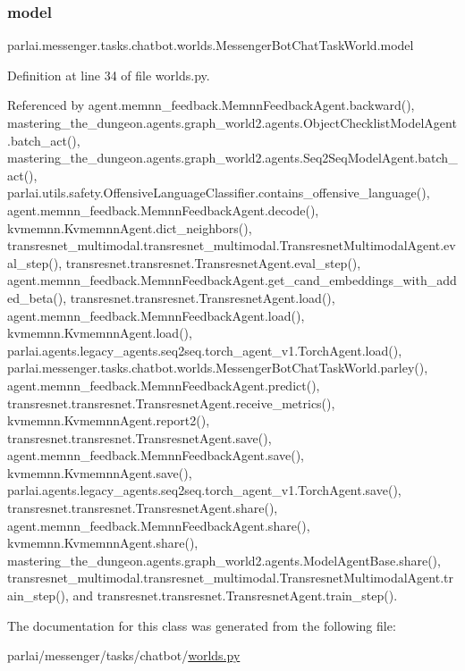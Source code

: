 \subsubsection{\texorpdfstring{model}{model}}
{\footnotesize\ttfamily parlai.\+messenger.\+tasks.\+chatbot.\+worlds.\+Messenger\+Bot\+Chat\+Task\+World.\+model}



Definition at line 34 of file worlds.\+py.



Referenced by agent.\+memnn\+\_\+feedback.\+Memnn\+Feedback\+Agent.\+backward(), mastering\+\_\+the\+\_\+dungeon.\+agents.\+graph\+\_\+world2.\+agents.\+Object\+Checklist\+Model\+Agent.\+batch\+\_\+act(), mastering\+\_\+the\+\_\+dungeon.\+agents.\+graph\+\_\+world2.\+agents.\+Seq2\+Seq\+Model\+Agent.\+batch\+\_\+act(), parlai.\+utils.\+safety.\+Offensive\+Language\+Classifier.\+contains\+\_\+offensive\+\_\+language(), agent.\+memnn\+\_\+feedback.\+Memnn\+Feedback\+Agent.\+decode(), kvmemnn.\+Kvmemnn\+Agent.\+dict\+\_\+neighbors(), transresnet\+\_\+multimodal.\+transresnet\+\_\+multimodal.\+Transresnet\+Multimodal\+Agent.\+eval\+\_\+step(), transresnet.\+transresnet.\+Transresnet\+Agent.\+eval\+\_\+step(), agent.\+memnn\+\_\+feedback.\+Memnn\+Feedback\+Agent.\+get\+\_\+cand\+\_\+embeddings\+\_\+with\+\_\+added\+\_\+beta(), transresnet.\+transresnet.\+Transresnet\+Agent.\+load(), agent.\+memnn\+\_\+feedback.\+Memnn\+Feedback\+Agent.\+load(), kvmemnn.\+Kvmemnn\+Agent.\+load(), parlai.\+agents.\+legacy\+\_\+agents.\+seq2seq.\+torch\+\_\+agent\+\_\+v1.\+Torch\+Agent.\+load(), parlai.\+messenger.\+tasks.\+chatbot.\+worlds.\+Messenger\+Bot\+Chat\+Task\+World.\+parley(), agent.\+memnn\+\_\+feedback.\+Memnn\+Feedback\+Agent.\+predict(), transresnet.\+transresnet.\+Transresnet\+Agent.\+receive\+\_\+metrics(), kvmemnn.\+Kvmemnn\+Agent.\+report2(), transresnet.\+transresnet.\+Transresnet\+Agent.\+save(), agent.\+memnn\+\_\+feedback.\+Memnn\+Feedback\+Agent.\+save(), kvmemnn.\+Kvmemnn\+Agent.\+save(), parlai.\+agents.\+legacy\+\_\+agents.\+seq2seq.\+torch\+\_\+agent\+\_\+v1.\+Torch\+Agent.\+save(), transresnet.\+transresnet.\+Transresnet\+Agent.\+share(), agent.\+memnn\+\_\+feedback.\+Memnn\+Feedback\+Agent.\+share(), kvmemnn.\+Kvmemnn\+Agent.\+share(), mastering\+\_\+the\+\_\+dungeon.\+agents.\+graph\+\_\+world2.\+agents.\+Model\+Agent\+Base.\+share(), transresnet\+\_\+multimodal.\+transresnet\+\_\+multimodal.\+Transresnet\+Multimodal\+Agent.\+train\+\_\+step(), and transresnet.\+transresnet.\+Transresnet\+Agent.\+train\+\_\+step().



The documentation for this class was generated from the following file\+:\begin{DoxyCompactItemize}
\item 
parlai/messenger/tasks/chatbot/\hyperlink{parlai_2messenger_2tasks_2chatbot_2worlds_8py}{worlds.\+py}\end{DoxyCompactItemize}
